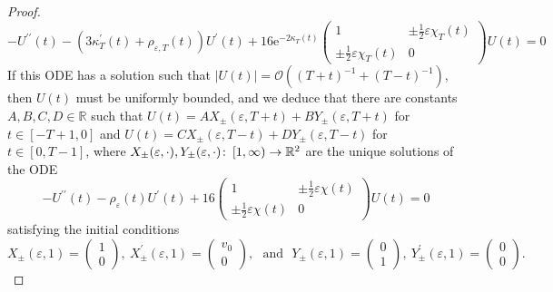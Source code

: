 \documentclass{article}
\numberwithin{equation}{section}        %
\theoremstyle{bfnote}
\theoremstyle{definition}
\theoremstyle{bfremark}
\newcommand{\col}{\colon \thinspace}        %
\newcommand{\R}{\mathbb{R}}                 %
\begin{document}
\begin{proof}
    \begin{equation*}
        - U^{\prime\prime}(t) - (3\kappa_T^\prime(t)+\rho_{\varepsilon,T}(t)) U^\prime(t) + 16 \mathrm{e}^{-2\kappa_T(t)} \begin{pmatrix}
                1 & \pm \frac{1}{2} \varepsilon \chi_T(t) \\
                \pm \frac{1}{2} \varepsilon \chi_T(t) & 0
            \end{pmatrix} U(t) = 0
    \end{equation*}
    If this ODE has a solution such that $|U(t)| = \mathcal{O}((T+t)^{-1} + (T-t)^{-1})$, then $U(t)$ must be uniformly bounded, and we deduce that there are constants $A, B, C, D \in \R$ such that $U(t) = A X_\pm(\varepsilon,T+t) + BY_\pm(\varepsilon,T+t)$ for $t \in [-T+1,0]$ and $U(t) = C X_\pm(\varepsilon,T-t) + D Y_\pm(\varepsilon,T-t)$ for $t \in [0,T-1]$, where $X_\pm(\varepsilon,\cdot), Y_\pm(\varepsilon,\cdot) \col [1,\infty) \rightarrow \R^2$ are the unique solutions of the ODE
    \begin{equation*}
        - U^{\prime\prime}(t) - \rho_\varepsilon(t) U^\prime(t) + 16 \begin{pmatrix} 1 & \pm \frac{1}{2} \varepsilon \chi(t) \\ \pm\frac{1}{2} \varepsilon \chi(t) & 0 \end{pmatrix} U(t) = 0
    \end{equation*}
    satisfying the initial conditions
        \begin{equation*}
            X_\pm(\varepsilon,1) = 
            \begin{pmatrix}
                1 \\
                0
            \end{pmatrix}, ~ X^\prime_\pm(\varepsilon,1) = 
            \begin{pmatrix}
                v_0 \\
                0
            \end{pmatrix}, ~~~ \text{and} ~~~ Y_\pm(\varepsilon,1) = 
            \begin{pmatrix}
                0\\
                1
            \end{pmatrix}, ~ Y^\prime_\pm(\varepsilon,1) = 
            \begin{pmatrix}
                0\\
                0
            \end{pmatrix}.
        \end{equation*}

\end{proof}
\end{document}
